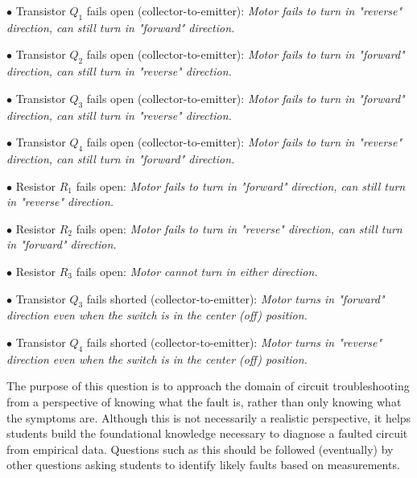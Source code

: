 \medskip
\item{$\bullet$} Transistor $Q_1$ fails open (collector-to-emitter): {\it Motor fails to turn in "reverse" direction, can still turn in "forward" direction.}
\vskip 5pt
\item{$\bullet$} Transistor $Q_2$ fails open (collector-to-emitter): {\it Motor fails to turn in "forward" direction, can still turn in "reverse" direction.}
\vskip 5pt
\item{$\bullet$} Transistor $Q_3$ fails open (collector-to-emitter): {\it Motor fails to turn in "forward" direction, can still turn in "reverse" direction.}
\vskip 5pt
\item{$\bullet$} Transistor $Q_4$ fails open (collector-to-emitter): {\it Motor fails to turn in "reverse" direction, can still turn in "forward" direction.}
\vskip 5pt
\item{$\bullet$} Resistor $R_1$ fails open: {\it Motor fails to turn in "forward" direction, can still turn in "reverse" direction.}
\vskip 5pt
\item{$\bullet$} Resistor $R_2$ fails open: {\it Motor fails to turn in "reverse" direction, can still turn in "forward" direction.}
\vskip 5pt
\item{$\bullet$} Resistor $R_3$ fails open: {\it Motor cannot turn in either direction.}
\vskip 5pt
\item{$\bullet$} Transistor $Q_3$ fails shorted (collector-to-emitter): {\it Motor turns in "forward" direction even when the switch is in the center (off) position.}
\vskip 5pt
\item{$\bullet$} Transistor $Q_4$ fails shorted (collector-to-emitter): {\it Motor turns in "reverse" direction even when the switch is in the center (off) position.}
\medskip







The purpose of this question is to approach the domain of circuit troubleshooting from a perspective of knowing what the fault is, rather than only knowing what the symptoms are.  Although this is not necessarily a realistic perspective, it helps students build the foundational knowledge necessary to diagnose a faulted circuit from empirical data.  Questions such as this should be followed (eventually) by other questions asking students to identify likely faults based on measurements.




